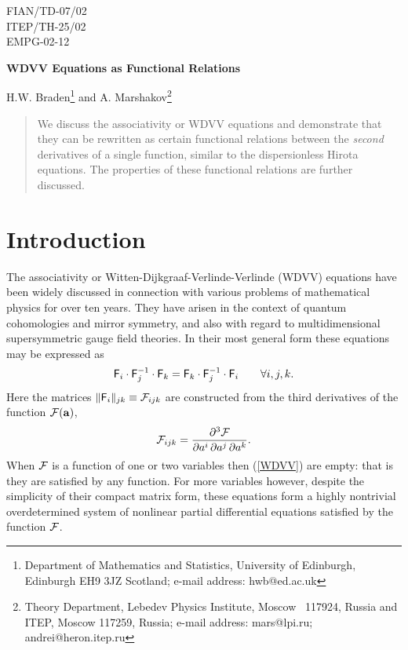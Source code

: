 \documentclass[a4paper,]{article}
\def\d{\partial}
\def\F{{\cal F}}
\def\f{{\sf F}}
\begin{document}
\begin{flushright}
FIAN/TD-07/02\\
ITEP/TH-25/02\\
EMPG-02-12
\end{flushright}
\vspace{0.5cm}

\begin{center}
{\LARGE \bf WDVV Equations as Functional Relations }
\end{center}
\vspace{0.5cm}

\begin{center}
{\Large H.W. Braden\footnote{Department of Mathematics and Statistics,
University of Edinburgh, Edinburgh EH9 3JZ Scotland;
e-mail address: hwb@ed.ac.uk }} {\large and} {\Large
A. Marshakov\footnote{Theory
Department, Lebedev Physics Institute, Moscow
~117924, Russia and ITEP,
Moscow 117259, Russia; e-mail address: mars@lpi.ru;
andrei@heron.itep.ru}}
\\
\end{center}

\begin{quotation}
\noindent
We discuss the associativity or WDVV equations and demonstrate that
they can be rewritten as certain functional relations between the {\it second}
derivatives of a single function, similar to the dispersionless Hirota
equations. The properties of these functional relations are further
discussed.
\end{quotation}


\section{Introduction}

The associativity or Witten-Dijkgraaf-Verlinde-Verlinde (WDVV) equations
\cite{WDVV} have been widely discussed in connection with various problems of
mathematical physics for over ten years. They have arisen in the context of
quantum cohomologies and mirror symmetry, and also with regard to
multidimensional supersymmetric gauge field theories.
In their most general form these equations may be expressed as \cite{MMM}
\begin{equation}
\label{WDVV}
\f_i\cdot \f_j^{-1}\cdot\f_k = \f_k\cdot \f_j^{-1}\cdot\f_i
\qquad \forall i,j,k. 
\end{equation}
Here the matrices $\|\f_i\|_{jk} \equiv \F_{ijk}$ are constructed from the
third derivatives of the function $\F({\bf a})$,
\begin{equation}
\label{thirdder}
\F_{ijk} =\dfrac{\d^3\F}{\d a\sp{i}\,\d a\sp{j}\,\d a\sp{k}}.
\end{equation}
When $\F$ is a function of one or two variables then (\ref{WDVV}) are empty:
that is they are satisfied by any function. For more variables however,
despite the simplicity of their compact matrix form, these equations
form a highly nontrivial overdetermined system of nonlinear partial
differential equations satisfied by the function $\F$.
\end{document}
